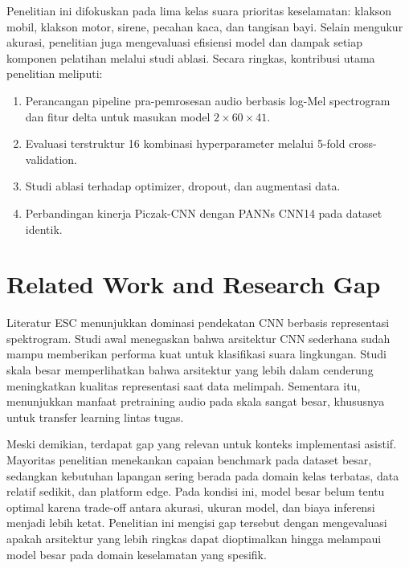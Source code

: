 \documentclass[10pt,a4paper]{jurnalvarian}
\let\LaTeXsection\section
\def\section{\setlength{\leftskip}{0cm}\LaTeXsection}
\begin{document}
Penelitian ini difokuskan pada lima kelas suara prioritas keselamatan: klakson mobil, klakson motor, sirene, pecahan kaca, dan tangisan bayi. Selain mengukur akurasi, penelitian juga mengevaluasi efisiensi model dan dampak setiap komponen pelatihan melalui studi ablasi. Secara ringkas, kontribusi utama penelitian meliputi:
\begin{enumerate}[leftmargin=1.25cm]
\item Perancangan pipeline pra-pemrosesan audio berbasis log-Mel spectrogram dan fitur delta untuk masukan model $2 \times 60 \times 41$.
\item Evaluasi terstruktur 16 kombinasi hyperparameter melalui 5-fold cross-validation.
\item Studi ablasi terhadap optimizer, dropout, dan augmentasi data.
\item Perbandingan kinerja Piczak-CNN dengan PANNs CNN14 pada dataset identik.
\end{enumerate}

\section{Related Work and Research Gap}
Literatur ESC menunjukkan dominasi pendekatan CNN berbasis representasi spektrogram. Studi awal \parencite{piczak2015esc} menegaskan bahwa arsitektur CNN sederhana sudah mampu memberikan performa kuat untuk klasifikasi suara lingkungan. Studi skala besar \parencite{hershey2017cnn} memperlihatkan bahwa arsitektur yang lebih dalam cenderung meningkatkan kualitas representasi saat data melimpah. Sementara itu, \parencite{kong2020panns} menunjukkan manfaat pretraining audio pada skala sangat besar, khususnya untuk transfer learning lintas tugas.

Meski demikian, terdapat gap yang relevan untuk konteks implementasi asistif. Mayoritas penelitian menekankan capaian benchmark pada dataset besar, sedangkan kebutuhan lapangan sering berada pada domain kelas terbatas, data relatif sedikit, dan platform edge. Pada kondisi ini, model besar belum tentu optimal karena trade-off antara akurasi, ukuran model, dan biaya inferensi menjadi lebih ketat. Penelitian ini mengisi gap tersebut dengan mengevaluasi apakah arsitektur yang lebih ringkas dapat dioptimalkan hingga melampaui model besar pada domain keselamatan yang spesifik.
\end{document}
